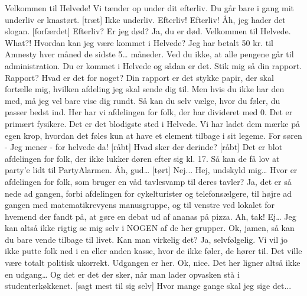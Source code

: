 \documentclass[a4paper,11pt]{article}
\begin{document}
\begin{sketch}
 Velkommen til Helvede! Vi tænder op under dit efterliv.
 Du går bare i gang mit underliv er knastørt.
[træt] Ikke underliv. Efterliv! Efterliv! Åh, jeg hader det slogan.
[forfærdet] Efterliv? Er jeg død?
 Ja, du er død. Velkommen til Helvede.
 What?! Hvordan kan jeg være kommet i Helvede? Jeg har betalt 50 kr. til Amnesty hver måned de sidste 5… måneder.
 Ved du ikke, at alle pengene går til administration. Du er kommet i Helvede og sådan er det. Stik mig så din rapport.
 Rapport? Hvad er det for noget?
 Din rapport er det stykke papir, der skal fortælle mig, hvilken afdeling jeg skal sende dig til. Men hvis du ikke har den med, må jeg vel bare vise dig rundt. Så kan du selv vælge, hvor du føler, du passer bedst ind.
 Her har vi afdelingen for folk, der har divideret med 0. Det er primært fysikere. Det er det blodigste sted i Helvede. Vi har ladet dem mærke på egen krop, hvordan det føles kun at have et element tilbage i sit legeme.
 For søren - Jeg mener - for helvede da!
[råbt] Hvad sker der derinde?
[råbt] Det er blot afdelingen for folk, der ikke lukker døren efter sig kl. 17. Så kan de få lov at party'e lidt til PartyAlarmen.
 Åh, gud…
[tørt] Nej...
 Hej, undskyld mig… Hvor er afdelingen for folk, som bruger en våd tavlesvamp til deres tavler?
 Ja, det er så nede ad gangen, forbi afdelingen for cykelturister og telefonsælgere, til højre ad gangen med matematikrevyens manusgruppe, og til venstre ved lokalet for hvemend der fandt på, at gøre en debat ud af ananas på pizza. 
 Ah, tak!
 Ej… Jeg kan altså ikke rigtig se mig selv i NOGEN af de her grupper. 
 Ok, jamen, så kan du bare vende tilbage til livet.
 Kan man virkelig det?
 Ja, selvfølgelig. Vi vil jo ikke putte folk ned i en eller anden kasse, hvor de ikke føler, de hører til. Det ville være totalt politisk ukorrekt. Udgangen er her. 
 Ok, nice.
 Det her ligner altså ikke en udgang… 
 Og det er det der sker, når man lader opvasken stå i studenterkøkkenet.
[sagt mest til sig selv] Hvor mange gange skal jeg sige det...

\end{sketch}
\end{document}
